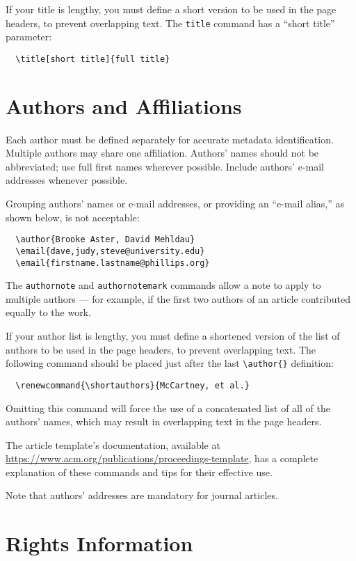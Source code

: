 \documentclass[tinyml]{acmart}
\begin{document}
If your title is lengthy, you must define a short version to be used
in the page headers, to prevent overlapping text. The \verb|title|
command has a ``short title'' parameter:
\begin{verbatim}
  \title[short title]{full title}
\end{verbatim}

\section{Authors and Affiliations}

Each author must be defined separately for accurate metadata
identification. Multiple authors may share one affiliation. Authors'
names should not be abbreviated; use full first names wherever
possible. Include authors' e-mail addresses whenever possible.

Grouping authors' names or e-mail addresses, or providing an ``e-mail
alias,'' as shown below, is not acceptable:
\begin{verbatim}
  \author{Brooke Aster, David Mehldau}
  \email{dave,judy,steve@university.edu}
  \email{firstname.lastname@phillips.org}
\end{verbatim}

The \verb|authornote| and \verb|authornotemark| commands allow a note
to apply to multiple authors --- for example, if the first two authors
of an article contributed equally to the work.

If your author list is lengthy, you must define a shortened version of
the list of authors to be used in the page headers, to prevent
overlapping text. The following command should be placed just after
the last \verb|\author{}| definition:
\begin{verbatim}
  \renewcommand{\shortauthors}{McCartney, et al.}
\end{verbatim}
Omitting this command will force the use of a concatenated list of all
of the authors' names, which may result in overlapping text in the
page headers.

The article template's documentation, available at
\url{https://www.acm.org/publications/proceedings-template}, has a
complete explanation of these commands and tips for their effective
use.

Note that authors' addresses are mandatory for journal articles.

\section{Rights Information}
\end{document}
